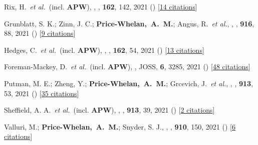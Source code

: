 \item[{\color{deemph}\scriptsize79}]Rix, H.~\textit{et al.}~(incl. \textbf{APW}), , \aj, \textbf{162}, 142, 2021 () [\href{http://adsabs.harvard.edu/abs/2021AJ....162..142R}{14 citations}]

\item[{\color{deemph}\scriptsize78}]Grunblatt, S. K.; Zinn, J. C.; \textbf{Price-Whelan,~A.~M.}; Angus, R.~\textit{et al.}, , \apj, \textbf{916}, 88, 2021 () [\href{http://adsabs.harvard.edu/abs/2021ApJ...916...88G}{9 citations}]

\item[{\color{deemph}\scriptsize77}]Hedges, C.~\textit{et al.}~(incl. \textbf{APW}), , \aj, \textbf{162}, 54, 2021 () [\href{http://adsabs.harvard.edu/abs/2021AJ....162...54H}{13 citations}]

\item[{\color{deemph}\scriptsize76}]Foreman-Mackey, D.~\textit{et al.}~(incl. \textbf{APW}), , JOSS, \textbf{6}, 3285, 2021 () [\href{http://adsabs.harvard.edu/abs/2021JOSS....6.3285F}{48 citations}]

\item[{\color{deemph}\scriptsize75}]Putman, M. E.; Zheng, Y.; \textbf{Price-Whelan,~A.~M.}; Grcevich, J.~\textit{et al.}, , \apj, \textbf{913}, 53, 2021 () [\href{http://adsabs.harvard.edu/abs/2021ApJ...913...53P}{35 citations}]

\item[{\color{deemph}\scriptsize74}]Sheffield, A. A.~\textit{et al.}~(incl. \textbf{APW}), , \apj, \textbf{913}, 39, 2021 () [\href{http://adsabs.harvard.edu/abs/2021ApJ...913...39S}{2 citations}]

\item[{\color{deemph}\scriptsize73}]Valluri, M.; \textbf{Price-Whelan,~A.~M.}; Snyder, S. J., , \apj, \textbf{910}, 150, 2021 () [\href{http://adsabs.harvard.edu/abs/2021ApJ...910..150V}{6 citations}]

